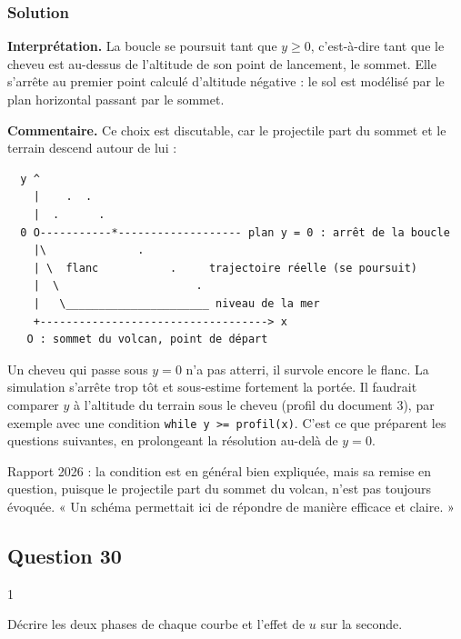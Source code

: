 \documentclass[11pt,a4paper]{article}
\renewcommand{\geq}{\geqslant}
\begin{document}
\hypertarget{solution-28}{%
\subsubsection{Solution}\label{solution-28}}

\textbf{Interprétation.} La boucle se poursuit tant que \(y \geq 0\), c'est-à-dire tant que le cheveu est au-dessus de l'altitude de son point de lancement, le sommet. Elle s'arrête au premier point calculé d'altitude négative : le sol est modélisé par le plan horizontal passant par le sommet.

\textbf{Commentaire.} Ce choix est discutable, car le projectile part du sommet et le terrain descend autour de lui :

\begin{lstlisting}
  y ^
    |    .  .
    |  .      .
  0 O-----------*------------------- plan y = 0 : arrêt de la boucle
    |\              .
    | \  flanc           .     trajectoire réelle (se poursuit)
    |  \                     .
    |   \______________________ niveau de la mer
    +-----------------------------------> x
   O : sommet du volcan, point de départ
\end{lstlisting}

Un cheveu qui passe sous \(y = 0\) n'a pas atterri, il survole encore le flanc. La simulation s'arrête trop tôt et sous-estime fortement la portée. Il faudrait comparer \(y\) à l'altitude du terrain sous le cheveu (profil du document 3), par exemple avec une condition \texttt{while\ y\ \textgreater{}=\allowbreak{}\ profil(\allowbreak{}x)\allowbreak{}}. C'est ce que préparent les questions suivantes, en prolongeant la résolution au-delà de \(y = 0\).

\begin{jury}

Rapport 2026 : la condition est en général bien expliquée, mais sa remise en question, puisque le projectile part du sommet du volcan, n'est pas toujours évoquée. « Un schéma permettait ici de répondre de manière efficace et claire. »

\end{jury}

\hypertarget{question-30}{%
\subsection{Question 30}\label{question-30}}

\begin{indication}{1}

Décrire les deux phases de chaque courbe et l'effet de \(u\) sur la seconde.

\end{indication}
\end{document}
